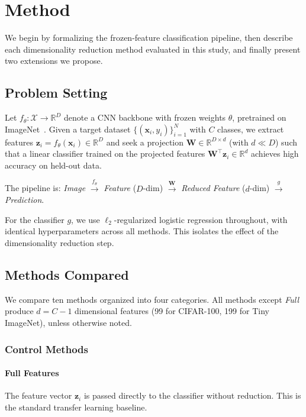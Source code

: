 \section{Method}
\label{sec:method}

We begin by formalizing the frozen-feature classification pipeline, then describe each dimensionality reduction method evaluated in this study, and finally present two extensions we propose.

\subsection{Problem Setting}

Let $f_\theta: \mathcal{X} \to \mathbb{R}^D$ denote a CNN backbone with frozen weights $\theta$, pretrained on ImageNet~\cite{deng2009imagenet}. Given a target dataset $\{(\mathbf{x}_i, y_i)\}_{i=1}^{N}$ with $C$ classes, we extract features $\mathbf{z}_i = f_\theta(\mathbf{x}_i) \in \mathbb{R}^D$ and seek a projection $\mathbf{W} \in \mathbb{R}^{D \times d}$ (with $d \ll D$) such that a linear classifier trained on the projected features $\mathbf{W}^\top\mathbf{z}_i \in \mathbb{R}^d$ achieves high accuracy on held-out data.

The pipeline is: \emph{Image} $\xrightarrow{f_\theta}$ \emph{Feature} ($D$-dim) $\xrightarrow{\mathbf{W}}$ \emph{Reduced Feature} ($d$-dim) $\xrightarrow{g}$ \emph{Prediction}.

For the classifier $g$, we use $\ell_2$-regularized logistic regression throughout, with identical hyperparameters across all methods. This isolates the effect of the dimensionality reduction step.

\subsection{Methods Compared}

We compare ten methods organized into four categories. All methods except \emph{Full} produce $d = C - 1$ dimensional features (99 for CIFAR-100, 199 for Tiny ImageNet), unless otherwise noted.

\subsubsection{Control Methods}

\paragraph{Full Features} The feature vector $\mathbf{z}_i$ is passed directly to the classifier without reduction. This is the standard transfer learning baseline.

